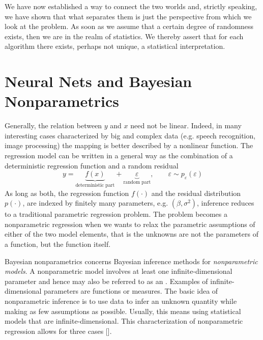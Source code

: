 We have now established a way to connect the two worlds and, strictly speaking, we have shown that what separates them is just the perspective from which we look at the problem. As soon as we assume that a certain degree of randomness exists, then we are in the realm of statistics. We thereby assert that for each algorithm there exists, perhaps not unique, a statistical interpretation.






\section{Neural Nets and Bayesian Nonparametrics}\label{sec:BNPreg}
Generally, the relation between $y$ and $x$ need not be linear. Indeed, in many interesting cases characterized by big and complex data (e.g. speech recognition, image processing) the mapping is better described by a nonlinear function. The regression model can be written in a general way as the combination of a deterministic regression function and a random residual
$$y = \underbrace{f(x)}_{\text{deterministic part}} + \underbrace{\varepsilon}_{\text{random part}}, \qquad \varepsilon \sim p_\varepsilon(\varepsilon)$$
As long as both, the regression function $f(\cdot)$ and the residual distribution $p(\cdot)$, are indexed by finitely many parameters, e.g. $(\beta, \sigma^2)$, inference reduces to a traditional parametric regression problem. The problem becomes a nonparametric regression when we wants to relax the parametric assumptions of either of the two model elements, that is the unknowns are not the parameters of a function, but the function itself.

Bayesian nonparametrics concerns Bayesian inference methods for \textit{nonparametric models}. A nonparametric model involves at least one infinite-dimensional parameter and hence may also be referred to as an . Examples of infinite-dimensional parameters are functions or measures. The basic idea of nonparametric inference is to use data to infer an unknown quantity while making as few assumptions as possible. Usually, this means using statistical models that are infinite-dimensional. This characterization of nonparametric regression allows for three cases [\cite{MullerQuint2004}].

